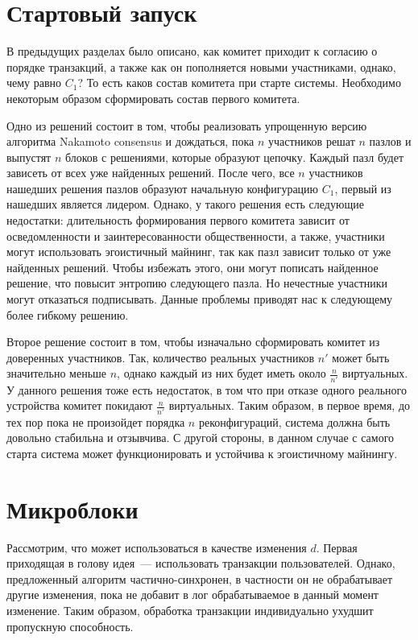 \section{Стартовый запуск}
В предыдущих разделах было описано, как комитет приходит к согласию о порядке транзакций, а также как он пополняется новыми участниками, однако, чему равно $C_1$? То есть каков состав комитета при старте системы. Необходимо некоторым образом сформировать состав первого комитета.

Одно из решений состоит в том, чтобы реализовать упрощенную версию алгоритма Nakamoto consensus и дождаться, пока $n$ участников решат $n$ пазлов и выпустят $n$ блоков с решениями, которые образуют цепочку. Каждый пазл будет зависеть от всех уже найденных решений. После чего, все $n$ участников нашедших решения пазлов образуют начальную конфигурацию $C_1$, первый из нашедших является лидером.
Однако, у такого решения есть следующие недостатки: длительность формирования первого комитета зависит от осведомленности и заинтересованности общественности, а также, участники могут использовать эгоистичный майнинг\cite{DBLP:journals/corr/EyalS13}, так как пазл зависит только от уже найденных решений. Чтобы избежать этого, они могут пописать найденное решение, что повысит энтропию следующего пазла. Но нечестные участники могут отказаться подписывать. Данные проблемы приводят нас к следующему более гибкому решению.

Второе решение состоит в том, чтобы изначально сформировать комитет из доверенных участников. Так, количество реальных участников $n'$ может быть значительно меньше $n$, однако каждый из них будет иметь около $\frac{n}{n'}$ виртуальных. У данного решения тоже есть недостаток, в том что при отказе одного реального устройства комитет покидают $\frac{n}{n'}$ виртуальных. Таким образом, в первое время, до тех пор пока не произойдет порядка $n$ реконфигураций, система должна быть довольно стабильна и отзывчива.
С другой стороны, в данном случае с самого старта система может функционировать и устойчива к эгоистичному майнингу.

\section{Микроблоки}
Рассмотрим, что может использоваться в качестве изменения $d$. Первая приходящая в голову идея~--- использовать транзакции пользователей. Однако, предложенный алгоритм частично-синхронен, в частности он не обрабатывает другие изменения, пока не добавит в лог обрабатываемое в данный момент изменение. Таким образом, обработка транзакции индивидуально ухудшит пропускную способность.

